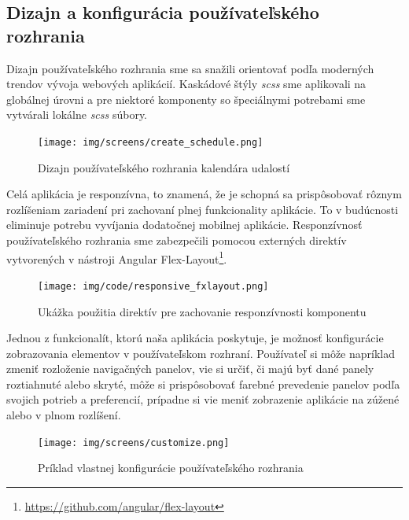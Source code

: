 \subsection{Dizajn a konfigurácia používateľského rozhrania}
\label{subsec:app_gui_design}

Dizajn používateľského rozhrania sme sa snažili orientovať podľa moderných trendov
vývoja webových aplikácií. Kaskádové štýly \textit{scss} sme aplikovali na globálnej úrovni
a pre niektoré komponenty so špeciálnymi potrebami sme vytvárali lokálne \textit{scss}
súbory.

\begin{figure}[ht]
  \centering
  \texttt{[image: img/screens/create\_schedule.png]}
  \caption{\label{fig:create_schedule} Dizajn používateľského rozhrania kalendára udalostí}
\end{figure}

Celá aplikácia je responzívna, to znamená, že je schopná sa prispôsobovať rôznym
rozlíšeniam zariadení pri zachovaní plnej funkcionality aplikácie. To v budúcnosti eliminuje potrebu
vyvíjania dodatočnej mobilnej aplikácie. Responzívnosť používateľského rozhrania sme zabezpečili
pomocou externých direktív vytvorených v nástroji Angular Flex-Layout\footnote{\url{https://github.com/angular/flex-layout}}.

\newpage
\begin{figure}[ht]
  \centering
  \texttt{[image: img/code/responsive\_fxlayout.png]}
  \caption{\label{fig:responsive_fxlayout} Ukážka použitia direktív pre zachovanie responzívnosti komponentu}
\end{figure}

Jednou z funkcionalít, ktorú naša aplikácia poskytuje, je možnosť konfigurácie zobrazovania
elementov v používateľskom rozhraní. Používateľ si môže napríklad zmeniť rozloženie navigačných panelov,
vie si určiť, či majú byť dané panely roztiahnuté alebo skryté, môže si prispôsobovať farebné prevedenie
panelov podľa svojich potrieb a preferencií, prípadne si vie meniť zobrazenie aplikácie na zúžené alebo v plnom rozlíšení. 

\begin{figure}[ht]
  \centering
  \texttt{[image: img/screens/customize.png]}
  \caption{\label{fig:customize} Príklad vlastnej konfigurácie používateľského rozhrania}
\end{figure}



